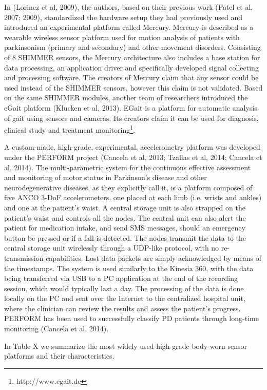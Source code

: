 In (Lorincz et al, 2009), the authors, based on their previous work (Patel et al, 2007; 2009), standardized the hardware setup they had previously used and introduced an experimental platform called Mercury. Mercury is described as a wearable wireless sensor platform used for motion analysis of patients with parkinsonism (primary and secondary) and other movement disorders. Consisting of 8 \gls{SHIMMER} sensors, the Mercury architecture also includes a base station for data processing, an application driver and specifically developed signal collecting and processing software. The creators of Mercury claim that any sensor could be used instead of the \gls{SHIMMER} sensors, however this claim is not validated. Based on the same \gls{SHIMMER} modules, another team of researchers introduced the eGait platform (Klucken et al, 2013). EGait is a platform for automatic analysis of gait using sensors and cameras. Its creators claim it can be used for diagnosis, clinical study and treatment monitoring\footnote{http://www.egait.de}.

A custom-made, high-grade, experimental, accelerometry platform was developed under the \gls{PERFORM} project (Cancela et al, 2013; Tzallas et al, 2014; Cancela et al, 2014). The multi-parametric system for the continuous effective assessment and monitoring of motor status in Parkinson's disease and other neurodegenerative diseases, as they explicitly call it, is a platform composed of five ANCO 3-DoF accelerometers, one placed at each limb (i.e. wrists and ankles) and one at the patient's waist. A central storage unit is also strapped on the patient's waist and controls all the nodes. The central unit can also alert the patient for medication intake, and send \gls{SMS} messages, should an emergency button be pressed or if a fall is detected. The nodes transmit the data to the central storage unit wirelessly through a \gls{UDP}-like protocol, with no re-transmission capabilities. Lost data packets are simply acknowledged by means of the timestamps. The system is used similarly to the Kinesia 360, with the data being transferred via \gls{USB} to a PC application at the end of the recording session, which would typically last a day. The processing of the data is done locally on the PC and sent over the Internet to the centralized hospital unit, where the clinician can review the results and assess the patient's progress. \gls{PERFORM} has been used to successfully classify \gls{PD} patients through long-time monitoring (Cancela et al, 2014).

In \textcolor{BurntOrange}{Table X} we summarize the most widely used high grade body-worn sensor platforms and their characteristics.

